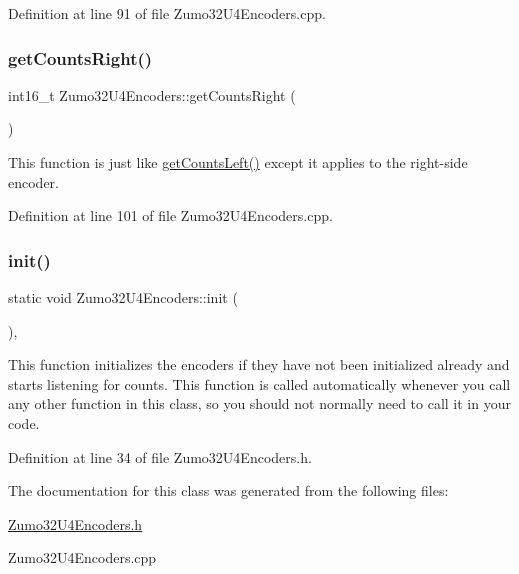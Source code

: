 Definition at line 91 of file Zumo32\+U4\+Encoders.\+cpp.

\mbox{\label{class_zumo32_u4_encoders_ad570df0c84cbb719dc975233b4f65756}} 
\subsubsection{\texorpdfstring{get\+Counts\+Right()}{getCountsRight()}}
{\footnotesize\ttfamily int16\+\_\+t Zumo32\+U4\+Encoders\+::get\+Counts\+Right (\begin{DoxyParamCaption}{ }\end{DoxyParamCaption})\hspace{0.3cm}{\ttfamily [static]}}

This function is just like \hyperlink{class_zumo32_u4_encoders_a142d33610a12b209e257c1635b2daae6}{get\+Counts\+Left()} except it applies to the right-\/side encoder. 

Definition at line 101 of file Zumo32\+U4\+Encoders.\+cpp.

\mbox{\label{class_zumo32_u4_encoders_afa1199db1c88dce2e42a461dc45df560}} 
\subsubsection{\texorpdfstring{init()}{init()}}
{\footnotesize\ttfamily static void Zumo32\+U4\+Encoders\+::init (\begin{DoxyParamCaption}{ }\end{DoxyParamCaption})\hspace{0.3cm}{\ttfamily [inline]}, {\ttfamily [static]}}

This function initializes the encoders if they have not been initialized already and starts listening for counts. This function is called automatically whenever you call any other function in this class, so you should not normally need to call it in your code. 

Definition at line 34 of file Zumo32\+U4\+Encoders.\+h.



The documentation for this class was generated from the following files\+:\begin{DoxyCompactItemize}
\item 
\hyperlink{_zumo32_u4_encoders_8h}{Zumo32\+U4\+Encoders.\+h}\item 
Zumo32\+U4\+Encoders.\+cpp\end{DoxyCompactItemize}
